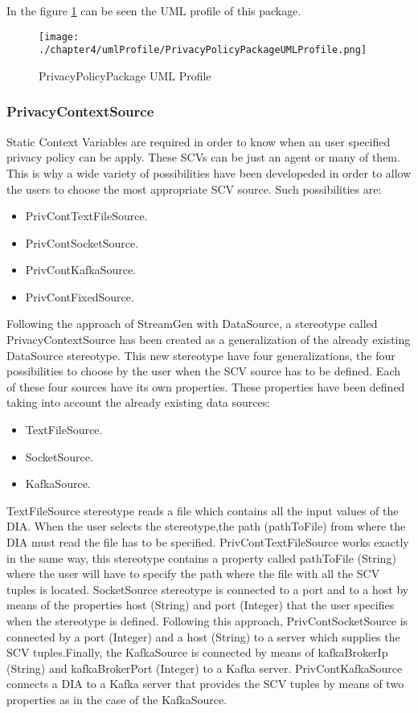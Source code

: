 In the figure \ref{fig:PrivacyPolicyPackage UML Profile} can be seen the UML profile of this package.

\begin{figure}
\centering
{\texttt{[image: ./chapter4/umlProfile/PrivacyPolicyPackageUMLProfile.png]}}
\caption{PrivacyPolicyPackage UML Profile}
\label{fig:PrivacyPolicyPackage UML Profile}
\end{figure}


\subsubsection{PrivacyContextSource}

Static Context Variables are required in order to know when an user specified privacy policy can be apply. These SCVs can be just an agent or many of them. This is why a wide variety of possibilities have been developeded in order to allow the users to choose the most appropriate SCV source. Such possibilities are:

\begin{itemize}
\item PrivContTextFileSource.
\item PrivContSocketSource.
\item PrivContKafkaSource.
\item PrivContFixedSource.
\end{itemize}

Following the approach of StreamGen with DataSource, a stereotype called PrivacyContextSource has been created as a generalization of the already existing DataSource stereotype. This new stereotype have four generalizations, the four possibilities to choose by the user when the SCV source has to be defined. Each of these four sources have its own properties. These properties have been defined taking into account the already existing data sources:

\begin{itemize}
\item TextFileSource.
\item SocketSource.
\item KafkaSource.
\end{itemize}

TextFileSource stereotype reads a file which contains all the input values of the DIA. When the user selects the stereotype,the path (pathToFile) from where the DIA must read the file has to be specified. PrivContTextFileSource works exactly in the same way, this stereotype contains a property called pathToFile (String) where the user will have to specify the path where the file with all the SCV tuples is located. SocketSource stereotype is connected to a port and to a host by means of the properties host (String) and port (Integer) that the user specifies when the stereotype is defined. Following this approach, PrivContSocketSource is connected by a port (Integer) and a host (String) to a server which supplies the SCV tuples.Finally, the KafkaSource is connected by means of kafkaBrokerIp (String) and kafkaBrokerPort (Integer) to a Kafka server. PrivContKafkaSource connects a DIA to a Kafka server that provides the SCV tuples by means of two properties as in the case of the KafkaSource.

